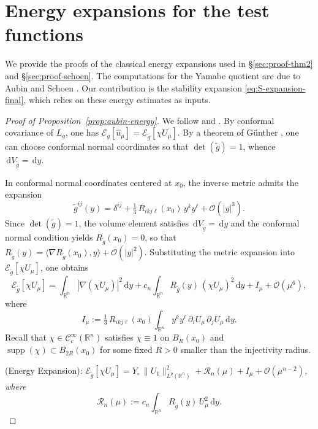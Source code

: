 \documentclass[reqno,11pt]{amsart}
\numberwithin{equation}{section}
\theoremstyle{definition}
\theoremstyle{remark}
\newcommand{\ud}{\,\mathrm{d}}
\DeclareMathOperator{\supp}{supp}
\newcommand{\R}{\mathbb{R}}
\begin{document}
\section{Energy expansions for the test functions}\label{sec:appendix-energy}
We provide the proofs of the classical energy expansions used in \S\ref{sec:proof-thm2} and \S\ref{sec:proof-schoen}. The computations for the Yamabe quotient are due to Aubin \cite{Aub} and Schoen \cite{Sch1}.
Our contribution is the stability expansion \eqref{eq:S-expansion-final}, which relies on these energy estimates as inputs.

\begin{proof}[Proof of Proposition~\ref{prop:aubin-energy}]
We follow \cite{Aub} and \cite[Section~6]{LP}. By conformal covariance of $L_g$, one has $\mathcal{E}_g[\hat{u}_\mu] = \mathcal{E}_{\tilde{g}}[\chi U_\mu]$. By a theorem of G\"unther \cite{Gun}, one can choose conformal normal coordinates so that $\det(\tilde{g}) = 1$, whence $\ud V_{\tilde{g}} = \ud y$.

In conformal normal coordinates centered at $x_0$, the inverse metric admits the expansion
\[
\tilde{g}^{ij}(y) = \delta^{ij} + \tfrac{1}{3}\, R_{ikj\ell}(x_0)\, y^k y^\ell + \mathcal{O}(|y|^3).
\]
Since $\det(\tilde{g}) = 1$, the volume element satisfies $\ud V_{\tilde{g}} = \ud y$ and the conformal normal condition yields $R_{\tilde{g}}(x_0) = 0$, so that $R_{\tilde{g}}(y) = \langle \nabla R_{\tilde{g}}(x_0), y \rangle + \mathcal{O}(|y|^2)$. Substituting the metric expansion into $\mathcal{E}_{\tilde{g}}[\chi U_\mu]$, one obtains
\begin{equation}\label{eq:aubin-energy-decomp}
\mathcal{E}_{\tilde{g}}[\chi U_\mu] = \int_{\R^n} |\nabla(\chi U_\mu)|^2 \ud y + c_n \int_{\R^n} R_{\tilde{g}}(y)\,(\chi U_\mu)^2 \ud y + I_\mu + \mathcal{O}(\mu^6),
\end{equation}
where
\begin{equation}
    \label{I mu}
    I_\mu := \tfrac{1}{3}\, R_{ikj\ell}(x_0) \int_{\R^n} y^k y^\ell\,\partial_i U_\mu\,\partial_j U_\mu \ud y.
\end{equation}
Recall that $\chi \in \mathcal{C}^\infty_c(\R^n)$ satisfies $\chi \equiv 1$ on $B_R(x_0)$ and $\supp(\chi) \subset B_{2R}(x_0)$ for some fixed $R > 0$ smaller than the injectivity radius.

\medskip
{} {\rm (Energy Expansion):} {\it $\mathcal{E}_{\tilde{g}}[\chi U_\mu] = 
Y_\circ\,\|U_1\|_{L^p(\R^n)}^2 + \mathcal{R}_n(\mu) + I_\mu + \mathcal{O}(\mu^{n-2})$, where}
\begin{equation}\label{eq:scalar-curvature-term}
    \mathcal{R}_n(\mu) := c_n \int_{\R^n} R_{\tilde{g}}(y)\, U_\mu^2 \ud y.
\end{equation}




\end{proof}
\end{document}
